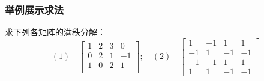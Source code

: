         \subsubsection{举例展示求法}
            \begin{problem}
                \par 求下列各矩阵的满秩分解：
                \begin{equation*}
                    (1) \quad \begin{bmatrix}
                        1 & 2 & 3 & 0 \\ 0 & 2 & 1 & -1 \\ 1 & 0 & 2 & 1 \\
                    \end{bmatrix}; \quad (2) \quad \begin{bmatrix}
                        1 & -1 & 1 & 1 \\ -1 & 1 & -1 & -1 \\ -1 & -1 & 1 & 1 \\ 1 & 1 & -1 & -1
                    \end{bmatrix}
                \end{equation*}
            \end{problem}
